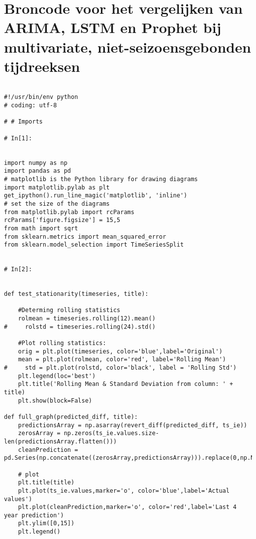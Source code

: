 \section{Broncode voor het vergelijken van ARIMA, LSTM en Prophet bij multivariate, niet-seizoensgebonden tijdreeksen}  %
\begin{verbatim}

#!/usr/bin/env python
# coding: utf-8

# # Imports

# In[1]:


import numpy as np
import pandas as pd
# matplotlib is the Python library for drawing diagrams
import matplotlib.pylab as plt
get_ipython().run_line_magic('matplotlib', 'inline')
# set the size of the diagrams
from matplotlib.pylab import rcParams
rcParams['figure.figsize'] = 15,5
from math import sqrt
from sklearn.metrics import mean_squared_error
from sklearn.model_selection import TimeSeriesSplit


# In[2]:


def test_stationarity(timeseries, title):
    
    #Determing rolling statistics
    rolmean = timeseries.rolling(12).mean()
#     rolstd = timeseries.rolling(24).std()

    #Plot rolling statistics:
    orig = plt.plot(timeseries, color='blue',label='Original')
    mean = plt.plot(rolmean, color='red', label='Rolling Mean')
#     std = plt.plot(rolstd, color='black', label = 'Rolling Std')
    plt.legend(loc='best')
    plt.title('Rolling Mean & Standard Deviation from column: ' + title)
    plt.show(block=False)
    
def full_graph(predicted_diff, title):
    predictionsArray = np.asarray(revert_diff(predicted_diff, ts_ie))
    zerosArray = np.zeros(ts_ie.values.size-len(predictionsArray.flatten()))
    cleanPrediction = pd.Series(np.concatenate((zerosArray,predictionsArray))).replace(0,np.NaN)
    
    # plot
    plt.title(title)
    plt.plot(ts_ie.values,marker='o', color='blue',label='Actual values')
    plt.plot(cleanPrediction,marker='o', color='red',label='Last 4 year prediction')
    plt.ylim([0,15])
    plt.legend()


\end{verbatim}
